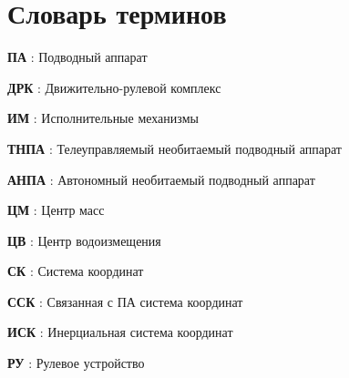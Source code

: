 \chapter*{Словарь терминов}             %

\textbf{ПА} : Подводный аппарат

\textbf{ДРК} : Движительно-рулевой комплекс

\textbf{ИМ} : Исполнительные механизмы

\textbf{ТНПА} : Телеуправляемый необитаемый подводный аппарат

\textbf{АНПА} : Автономный необитаемый подводный аппарат

\textbf{ЦМ} : Центр масс

\textbf{ЦВ} : Центр водоизмещения

\textbf{СК} : Система координат

\textbf{ССК} : Связанная с ПА система координат

\textbf{ИСК} : Инерциальная система координат

\textbf{РУ} : Рулевое устройство